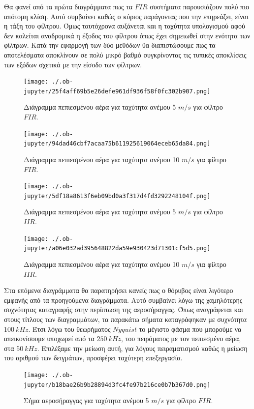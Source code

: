 \documentclass[breaklines=true, 12pt]{article}
\begin{document}
{{{Θα φανεί από τα πρώτα διαγράμματα πως τα \(FIR\) συστήματα παρουσιάζουν πολύ
πιο απότομη κλίση. Αυτό συμβαίνει καθώς ο κύριος παράγοντας που την επηρεάζει,
είναι η τάξη του φίλτρου. Όμως ταυτόχρονα αυξάνεται και η ταχύτητα υπολογισμού
αφού δεν καλείται αναδρομικά η έξοδος του φίλτρου όπως έχει σημειωθεί στην
ενότητα των φίλτρων. Κατά την εφαρμογή των δύο μεθόδων θα διαπιστώσουμε πως τα
αποτελέσματα αποκλίνουν σε πολύ μικρό βαθμό συγκρίνοντας τις τυπικές
αποκλίσεις των εξόδων σχετικά με την είσοδο των φίλτρων.

\begin{figure}[htbp]
\centering
\texttt{[image: ./.ob-jupyter/25f4aff69b5e26defe961df936f58f0fc302b907.png]}
\caption{\label{fc1_5}Διάγραμμα πεπιεσμένου αέρα για ταχύτητα ανέμου 5 \(m/s\) για φίλτρο \(FIR\).}
\end{figure}

\begin{figure}[htbp]
\centering
\texttt{[image: ./.ob-jupyter/94dad46cbf7acaa75b611925619064eceb65da84.png]}
\caption{\label{fc1_10_ref}Διάγραμμα πεπιεσμένου αέρα για ταχύτητα ανέμου 10 \(m/s\) για φίλτρο \(FIR\).}
\end{figure}

\begin{figure}[htbp]
\centering
\texttt{[image: ./.ob-jupyter/5df18a8613f6eb09bd0a3f317d4fd3292248104f.png]}
\caption{\label{ic1_5}Διάγραμμα πεπιεσμένου αέρα για ταχύτητα ανέμου 5 \(m/s\) για φίλτρο \(IIR\).}
\end{figure}

\begin{figure}[H]
\centering
\texttt{[image: ./.ob-jupyter/a06e032ad395648822da59e930423d71301cf5d5.png]}
\caption{\label{ic1_10}Διάγραμμα πεπιεσμένου αέρα για ταχύτητα ανέμου 10 \(m/s\) για φίλτρο \(IIR\).}
\end{figure}

Στα επόμενα διαγράμματα θα παρατηρήσει κανείς πως ο θόρυβος είναι λιγότερο εμφανής από τα
προηγούμενα διαγράμματα. Αυτό συμβαίνει λόγω της χαμηλότερης συχνότητας
καταγραφής στην περίπτωση της αεροσήραγγας. Όπως αναγράφεται και στους
τίτλους των διαγραμμάτων, τα παρακάτω σήματα καταγράφηκαν με συχνότητα
\(100\ kHz\). Έτσι λόγω του θεωρήματος \(Nyquist\) το μέγιστο φάσμα που
μπορούμε να απεικονίσουμε υποχωρεί από τα \(250\ kHz\), του πειράματος με
τον πεπιεσμένο αέρα, στα \(50\ kHz\). Επιλέξαμε την μείωση αυτή, για
λόγους πειραματισμού καθώς η μείωση του αριθμού των δειγμάτων, προσφέρει
ταχύτερη επεξεργασία.
\begin{figure}[b]
\centering
\texttt{[image: ./.ob-jupyter/b18bae26b9b28894d3fc4fe97b216ce0b7b367d0.png]}
\caption{\label{fi1_5}Σήμα αεροσήραγγας για ταχύτητα ανέμου 5 \(m/s\) για φίλτρο \(FIR\).}
\end{figure}

}}}
\end{document}
